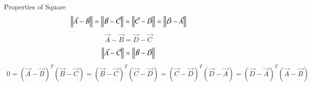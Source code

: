 \documentclass{beamer}
\begin{document}
\begin{frame}{Properties of Square}
    \begin{align}
        \left\lVert\Vec{A}-\Vec{B}\right\rVert= \left\lVert\Vec{B}-\Vec{C}\right\rVert= \left\lVert\Vec{C}-\Vec{D}\right\rVert= \left\lVert\Vec{D}-\Vec{A}\right\rVert
    \end{align}
    \begin{align}
        \Vec{A}-\Vec{B}=\Vec{D}-\Vec{C}
    \end{align}
    \begin{align}
         \left\lVert\Vec{A}-\Vec{C}\right\rVert= \left\lVert\Vec{B}-\Vec{D}\right\rVert
    \end{align}
    \begin{align}
        0=(\Vec{A}-\Vec{B})^T(\Vec{B}-\Vec{C})=(\Vec{B}-\Vec{C})^T(\Vec{C}-\Vec{D})=(\Vec{C}-\Vec{D})^T(\Vec{D}-\Vec{A})=(\Vec{D}-\Vec{A})^T(\Vec{A}-\Vec{B})
\end{align}



\end{frame}
\end{document}
